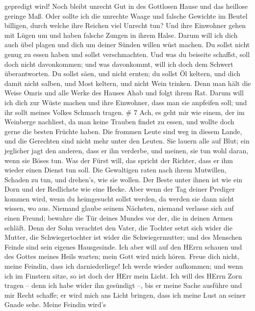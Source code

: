 gepredigt wird!  Noch bleibt unrecht Gut in des Gottlosen
Hause und das heillose geringe Maß.  Oder sollte ich die
unrechte Waage und falsche Gewichte im Beutel billigen, 
durch welche ihre Reichen viel Unrecht tun? Und ihre Einwohner gehen mit
Lügen um und haben falsche Zungen in ihrem Halse.  Darum
will ich dich auch übel plagen und dich um deiner Sünden willen wüst
machen.  Du sollst nicht genug zu essen haben und sollst
verschmachten. Und was du beiseite schaffst, soll doch nicht
davonkommen; und was davonkommt, will ich doch dem Schwert
überantworten.  Du sollst säen, und nicht ernten; du sollst
Öl keltern, und dich damit nicht salben, und Most keltern, und nicht
Wein trinken.  Denn man hält die Weise Omris und alle Werke
des Hauses Ahab und folgt ihrem Rat. Darum will ich dich zur Wüste
machen und ihre Einwohner, dass man sie anpfeifen soll; und ihr sollt
meines Volkes Schmach tragen. \# 7  Ach, es geht mir wie
einem, der im Weinberge nachliest, da man keine Trauben findet zu essen,
und wollte doch gerne die besten Früchte haben.  Die frommen
Leute sind weg in diesem Lande, und die Gerechten sind nicht mehr unter
den Leuten. Sie lauern alle auf Blut; ein jeglicher jagt den anderen,
dass er ihn verderbe,  und meinen, sie tun wohl daran, wenn
sie Böses tun. Was der Fürst will, das spricht der Richter, dass er ihm
wieder einen Dienst tun soll. Die Gewaltigen raten nach ihrem Mutwillen,
Schaden zu tun, und drehen's, wie sie wollen.  Der Beste
unter ihnen ist wie ein Dorn und der Redlichste wie eine Hecke. Aber
wenn der Tag deiner Prediger kommen wird, wenn du heimgesucht sollst
werden, da werden sie dann nicht wissen, wo aus.  Niemand
glaube seinem Nächsten, niemand verlasse sich auf einen Freund; bewahre
die Tür deines Mundes vor der, die in deinen Armen schläft. 
Denn der Sohn verachtet den Vater, die Tochter setzt sich wider die
Mutter, die Schwiegertochter ist wider die Schwiegermutter; und des
Menschen Feinde sind sein eigenes Hausgesinde.  Ich aber
will auf den HErrn schauen und des Gottes meines Heils warten; mein Gott
wird mich hören.  Freue dich nicht, meine Feindin, dass ich
darniederliege! Ich werde wieder aufkommen; und wenn ich im Finstern
sitze, so ist doch der HErr mein Licht.  Ich will des HErrn
Zorn tragen -- denn ich habe wider ihn gesündigt --, bis er meine Sache
ausführe und mir Recht schaffe; er wird mich ans Licht bringen, dass ich
meine Lust an seiner Gnade sehe.  Meine Feindin wird's
